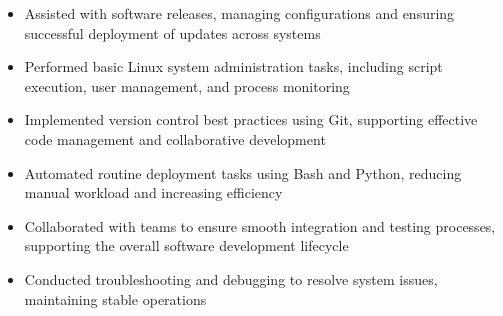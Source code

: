 \par\smallskip
\noindent
\begin{minipage}{20cm}
  \begin{minipage}{9.75cm}
    \begin{itemize}
      \item Assisted with software releases, managing configurations and ensuring successful deployment of updates across systems
      \item Performed basic Linux system administration tasks, including script execution, user management, and process monitoring
      \item Implemented version control best practices using Git, supporting effective code management and collaborative development
    \end{itemize}
  \end{minipage}
  \hfill
  \begin{minipage}{9.75cm}
    \begin{itemize}
      \item Automated routine deployment tasks using Bash and Python, reducing manual workload and increasing efficiency
      \item Collaborated with teams to ensure smooth integration and testing processes, supporting the overall software development lifecycle
      \item Conducted troubleshooting and debugging to resolve system issues, maintaining stable operations
    \end{itemize}
  \end{minipage}
\end{minipage}
\par\smallskip
\divider

